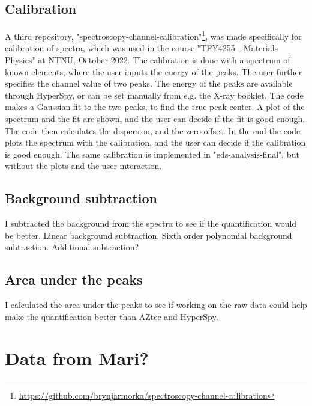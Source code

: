 \subsection{Calibration}
\label{sec:method:treatment:calibration}
A third repository, "spectroscopy-channel-calibration"\footnote{\url{https://github.com/brynjarmorka/spectroscopy-channel-calibration}}, was made specifically for calibration of spectra, which was used in the course "TFY4255 - Materials Physics" at NTNU, October 2022.
The calibration is done with a spectrum of known elements, where the user inputs the energy of the peaks.
The user further specifies the channel value of two peaks.
The energy of the peaks are available through HyperSpy, or can be set manually from e.g. the X-ray booklet.
The code makes a Gaussian fit to the two peaks, to find the true peak center.
A plot of the spectrum and the fit are shown, and the user can decide if the fit is good enough.
The code then calculates the dispersion, and the zero-offset.
In the end the code plots the spectrum with the calibration, and the user can decide if the calibration is good enough.
The same calibration is implemented in "eds-analysis-final", but without the plots and the user interaction.


\subsection{Background subtraction}
\label{sec:method:treatment:background}
I subtracted the background from the spectra to see if the quantification would be better.
Linear background subtraction.
Sixth order polynomial background subtraction.
Additional subtraction?

\subsection{Area under the peaks}
\label{sec:method:treatment:area}
I calculated the area under the peaks to see if working on the raw data could help make the quantification better than AZtec and HyperSpy.


%
%
\section{Data from Mari?}
\label{sec:method:mar}
